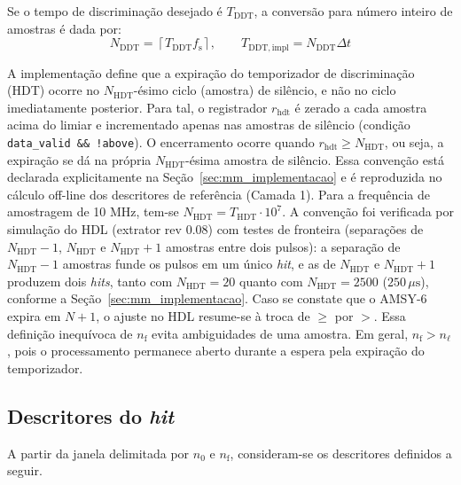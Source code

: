 Se o tempo de discriminação desejado é \(T_{\mathrm{DDT}}\), a conversão para número inteiro de amostras é dada por:
\begin{equation}
	N_{\mathrm{DDT}} = \left\lceil T_{\mathrm{DDT}}f_{\mathrm{s}} \right\rceil, \qquad T_{\mathrm{DDT,impl}} = N_{\mathrm{DDT}}\Delta t
	\label{v2:eq:ddt_amostras}
\end{equation}

A implementação define que a expiração do temporizador de discriminação (HDT) ocorre no \(N_{\mathrm{HDT}}\)-ésimo ciclo (amostra) de silêncio, e não no ciclo imediatamente posterior. Para tal, o registrador \(r_{\mathrm{hdt}}\) é zerado a cada amostra acima do limiar e incrementado apenas nas amostras de silêncio (condição \texttt{data\_valid \&\& !above}). O encerramento ocorre quando \(r_{\mathrm{hdt}} \geq N_{\mathrm{HDT}}\), ou seja, a expiração se dá na própria \(N_{\mathrm{HDT}}\)-ésima amostra de silêncio. Essa convenção está declarada explicitamente na Seção~\ref{sec:mm_implementacao} e é reproduzida no cálculo off-line dos descritores de referência (Camada 1). Para a frequência de amostragem de 10 MHz, tem-se \(N_{\mathrm{HDT}} = T_{\mathrm{HDT}} \cdot 10^7\). A convenção foi verificada por simulação do HDL (extrator rev 0.08) com testes de fronteira (separações de \(N_{\mathrm{HDT}}-1\), \(N_{\mathrm{HDT}}\) e \(N_{\mathrm{HDT}}+1\) amostras entre dois pulsos): a separação de \(N_{\mathrm{HDT}}-1\) amostras funde os pulsos em um único \textit{hit}, e as de \(N_{\mathrm{HDT}}\) e \(N_{\mathrm{HDT}}+1\) produzem dois \textit{hits}, tanto com \(N_{\mathrm{HDT}} = 20\) quanto com \(N_{\mathrm{HDT}} = 2500\) (\(250\,\mu\mathrm{s}\)), conforme a Seção~\ref{sec:mm_implementacao}. Caso se constate que o AMSY-6 expira em \(N+1\), o ajuste no HDL resume-se à troca de \(\geq\) por \(>\). Essa definição inequívoca de \(n_{\mathrm{f}}\) evita ambiguidades de uma amostra. Em geral, \(n_{\mathrm{f}}>n_{\ell}\), pois o processamento permanece aberto durante a espera pela expiração do temporizador.
\subsection{Descritores do \textit{hit}}
\label{v2:subsec:descritores_hit}

A partir da janela delimitada por \(n_0\) e \(n_{\mathrm{f}}\), consideram-se os descritores definidos a seguir.

